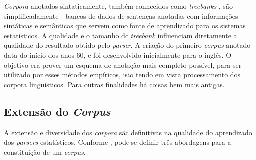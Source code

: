 \emph{Corpora} anotados sintaticamente, também conhecidos como \emph{treebanks} \cite{abeille03}, são - simplificadamente - bancos de dados de sentenças anotadas com informações sintáticas e semânticas que servem como fonte de aprendizado para os sistemas estatísticos. A qualidade e o tamanho do \emph{treebank} influenciam diretamente a qualidade do resultado obtido pelo \emph{parser}. A criação do primeiro \emph{corpus} anotado data do início dos anos 60, e foi desenvolvido inicialmente para o inglês. O objetivo era prover um esquema de anotação mais completo possível, para ser utilizado por esses métodos empíricos, isto tendo em vista processamento dos corpora linguísticos. Para outras finalidades há coisas bem mais antigas.

\subsection{Extensão do \emph{Corpus}} %
\label{sub:extensao_do_corpus}

A extensão e diversidade dos \emph{corpora} são definitivas na qualidade do aprendizado dos \emph{parsers} estatísticos. Conforme \cite{sardinha04}, pode-se definir três abordagens para a constituição de um \emph{corpus}.

